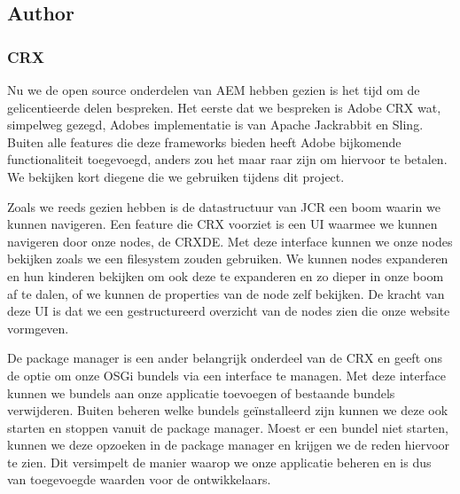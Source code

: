 \documentclass{article}
\begin{document}
	\subsection{Author}
	\subsubsection{CRX}
	Nu we de open source onderdelen van AEM hebben gezien is het tijd om de gelicentieerde delen bespreken. Het eerste dat we bespreken is Adobe CRX wat, simpelweg gezegd, Adobes implementatie is van Apache Jackrabbit en Sling. Buiten alle features die deze frameworks bieden heeft Adobe bijkomende functionaliteit toegevoegd, anders zou het maar raar zijn om hiervoor te betalen. We bekijken kort diegene die we gebruiken tijdens dit project.
	\par
	Zoals we reeds gezien hebben is de datastructuur van JCR een boom waarin we kunnen navigeren. Een feature die CRX voorziet is een UI waarmee we kunnen navigeren door onze nodes, de CRXDE. Met deze interface kunnen we onze nodes bekijken zoals we een filesystem zouden gebruiken. We kunnen nodes expanderen en hun kinderen bekijken om ook deze te expanderen en zo dieper in onze boom af te dalen, of we kunnen de properties van de node zelf bekijken. De kracht van deze UI is dat we een gestructureerd overzicht van de nodes zien die onze website vormgeven.
	\par
	De package manager is een ander belangrijk onderdeel van de CRX en geeft ons de optie om onze OSGi bundels via een interface te managen. Met deze interface kunnen we bundels aan onze applicatie toevoegen of bestaande bundels verwijderen. Buiten beheren welke bundels geïnstalleerd zijn kunnen we deze ook starten en stoppen vanuit de package manager. Moest er een bundel niet starten, kunnen we deze opzoeken in de package manager en krijgen we de reden hiervoor te zien. Dit versimpelt de manier waarop we onze applicatie beheren en is dus van toegevoegde waarden voor de ontwikkelaars.
\end{document}
